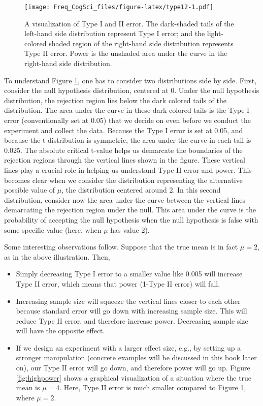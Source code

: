 \documentclass[
  12pt,
]{krantz}
\providecommand{\tightlist}{%
  \setlength{\itemsep}{0pt}\setlength{\parskip}{0pt}}
\theoremstyle{definition}
\theoremstyle{definition}
\theoremstyle{definition}
\theoremstyle{definition}
\theoremstyle{remark}
\begin{document}
\begin{figure}
\centering
\texttt{[image: Freq\_CogSci\_files/figure-latex/type12-1.pdf]}
\caption{\label{fig:type12}A visualization of Type I and II error. The dark-shaded tails of the left-hand side distribution represent Type I error; and the light-colored shaded region of the right-hand side distribution represents Type II error. Power is the unshaded area under the curve in the right-hand side distribution.}
\end{figure}

To understand Figure \ref{fig:type12}, one has to consider two distributions side by side. First, consider the null hypothesis distribution, centered at 0. Under the null hypothesis distribution, the rejection region lies below the dark colored tails of the distribution. The area under the curve in these dark-colored tails is the Type I error (conventionally set at 0.05) that we decide on even before we conduct the experiment and collect the data. Because the Type I error is set at 0.05, and because the t-distribution is symmetric, the area under the curve in each tail is 0.025. The absolute critical t-value helps us demarcate the boundaries of the rejection regions through the vertical lines shown in the figure. These vertical lines play a crucial role in helping us understand Type II error and power. This becomes clear when we consider the distribution representing the alternative possible value of \(\mu\), the distribution centered around 2. In this second distribution, consider now the area under the curve between the vertical lines demarcating the rejection region under the null. This area under the curve is the probability of accepting the null hypothesis when the null hypothesis is false with some specific value (here, when \(\mu\) has value 2).

Some interesting observations follow. Suppose that the true mean is in fact \(\mu=2\), as in the above illustration. Then,

\begin{itemize}
\tightlist
\item
  Simply decreasing Type I error to a smaller value like 0.005 will increase Type II error, which means that power (1-Type II error) will fall.
\item
  Increasing sample size will squeeze the vertical lines closer to each other because standard error will go down with increasing sample size. This will reduce Type II error, and therefore increase power. Decreasing sample size will have the opposite effect.
\item
  If we design an experiment with a larger effect size, e.g., by setting up a stronger manipulation (concrete examples will be discussed in this book later on), our Type II error will go down, and therefore power will go up. Figure \ref{fig:highpower} shows a graphical visualization of a situation where the true mean is \(\mu=4\). Here, Type II error is much smaller compared to Figure \ref{fig:type12}, where \(\mu=2\).
\end{itemize}
\end{document}
